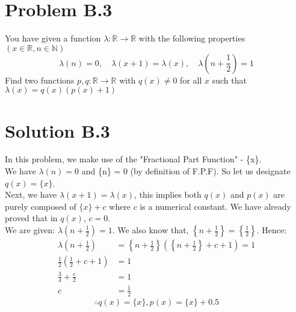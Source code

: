 \documentclass{article}
\begin{document}
\newpage
\section*{Problem B.3}
You have given a function $\lambda: \mathbb{R} \rightarrow \mathbb{R}$ with the following properties $(x \in \mathbb{R}, n \in \mathbb{N})$
$$
\lambda(n)=0, \quad \lambda(x+1)=\lambda(x), \quad \lambda\left(n+\frac{1}{2}\right)=1
$$
Find two functions $p, q: \mathbb{R} \rightarrow \mathbb{R}$ with $q(x) \neq 0$ for all $x$ such that $\lambda(x)=q(x)(p(x)+1)$
\section*{Solution B.3}
In this problem, we make use of the "Fractional Part Function" - \{x\}. \\
We have $\lambda(n)=0$ and \{n\} = 0 (by definition of F.P.F). So let us designate $q(x)=\{x\}$. \\
Next, we have $\lambda(x+1)=\lambda(x)$, this implies both $q(x)$ and $p(x)$ are purely composed of $\{x\}+c$ where $c$ is a numerical constant. We have already proved that in $q(x)$, $c=0$. \\
We are given: $\lambda\left(n+\frac{1}{2}\right)=1$. We also know that, $\left\{n+\frac{1}{2}\right\}=\left\{\frac{1}{2}\right\}$. Hence:
\begin{align*}
    \lambda\left(n+\frac{1}{2}\right)&=\left\{n+\frac{1}{2}\right\}\left(\left\{n+\frac{1}{2}\right\}+c+1\right)=1\\
    \frac{1}{2}\left(\frac{1}{2}+c+1\right)&=1 \\
    \frac{3}{4}+\frac{c}{2}&=1 \\
    c&=\frac{1}{2}
\end{align*}
\[\boxed{\therefore q(x)=\{x\}, p(x)=\{x\}+0.5}\]
\end{document}
